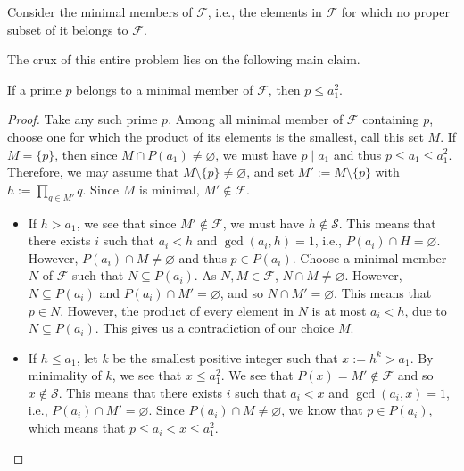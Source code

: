 \documentclass[11pt]{article}
\begin{document}
Consider the minimal members of $\mathcal{F}$, i.e., the elements in $\mathcal{F}$ for which no proper subset of it belongs to $\mathcal{F}$.

\medskip
The crux of this entire problem lies on the following main claim.
\begin{claim}
    If a prime $p$ belongs to a minimal member of $\mathcal{F}$, then $p \le a_1^2$.
\end{claim}
\begin{proof}
    Take any such prime $p$. Among all minimal member of $\mathcal{F}$ containing $p$, choose one for which the product of its elements is the smallest, call this set $M$. If $M = \{ p \}$, then since $M \cap P(a_1) \not= \varnothing$, we must have $p \mid a_1$ and thus $p \le a_1 \le a_1^2$. Therefore, we may assume that $M \setminus \{ p \} \not= \varnothing$, and set $M' := M \setminus \{ p \}$ with $h := \prod_{q \in M'} q$. Since $M$ is minimal, $M' \notin \mathcal{F}$.
    \begin{itemize}
        \item If $h > a_1$, we see that since $M' \notin \mathcal{F}$, we must have $h \notin \mathcal{S}$. This means that there exists $i$ such that $a_i < h$ and $\gcd(a_i, h) = 1$, i.e., $P(a_i) \cap H = \varnothing$. However, $P(a_i) \cap M \not= \varnothing$ and thus $p \in P(a_i)$. Choose a minimal member $N$ of $\mathcal{F}$ such that $N \subseteq P(a_i)$. As $N, M \in \mathcal{F}$, $N \cap M \not= \varnothing$. However, $N \subseteq P(a_i)$ and $P(a_i) \cap M' = \varnothing$, and so $N \cap M' = \varnothing$. This means that $p \in N$. However, the product of every element in $N$ is at most $a_i < h$, due to $N \subseteq P(a_i)$. This gives us a contradiction of our choice $M$.
        \item If $h \le a_1$, let $k$ be the smallest positive integer such that $x := h^k > a_1$. By minimality of $k$, we see that $x \le a_1^2$. We see that $P(x) = M' \notin \mathcal{F}$ and so $x \notin \mathcal{S}$. This means that there exists $i$ such that $a_i < x$ and $\gcd(a_i, x) = 1$, i.e., $P(a_i) \cap M' = \varnothing$. Since $P(a_i) \cap M \not= \varnothing$, we know that $p \in P(a_i)$, which means that $p \le a_i < x \le a_1^2$.
    \end{itemize}
\end{proof}
\end{document}
